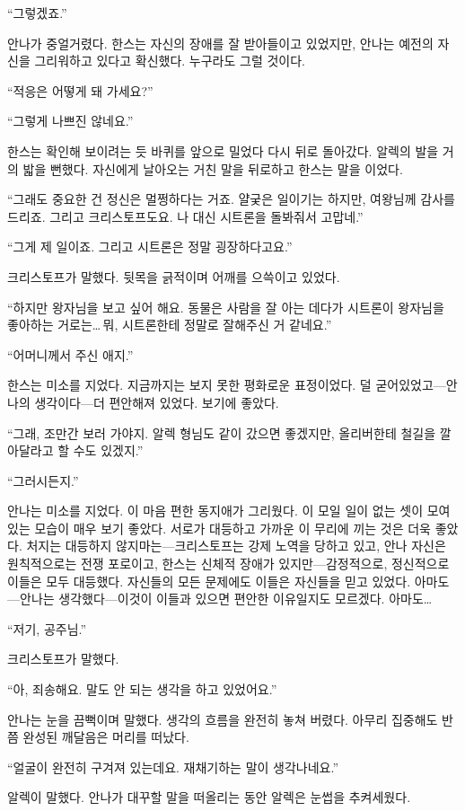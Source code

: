 ``그렇겠죠.''

안나가 중얼거렸다. 한스는 자신의 장애를 잘 받아들이고 있었지만, 안나는 예전의 자신을 그리워하고 있다고 확신했다. 누구라도 그럴 것이다.

``적응은 어떻게 돼 가세요?''

``그렇게 나쁘진 않네요.''

한스는 확인해 보이려는 듯 바퀴를 앞으로 밀었다 다시 뒤로 돌아갔다. 알렉의 발을 거의 밟을 뻔했다. 자신에게 날아오는 거친 말을 뒤로하고 한스는 말을 이었다.

``그래도 중요한 건 정신은 멀쩡하다는 거죠. 얄궂은 일이기는 하지만, 여왕님께 감사를 드리죠. 그리고 크리스토프도요. 나 대신 시트론을 돌봐줘서 고맙네.''

``그게 제 일이죠. 그리고 시트론은 정말 굉장하다고요.''

크리스토프가 말했다. 뒷목을 긁적이며 어깨를 으쓱이고 있었다.

``하지만 왕자님을 보고 싶어 해요. 동물은 사람을 잘 아는 데다가 시트론이 왕자님을 좋아하는 거로는\ldots\,뭐, 시트론한테 정말로 잘해주신 거 같네요.''

``어머니께서 주신 애지.''

한스는 미소를 지었다. 지금까지는 보지 못한 평화로운 표정이었다. 덜 굳어있었고—안나의 생각이다—더 편안해져 있었다. 보기에 좋았다.

``그래, 조만간 보러 가야지. 알렉 형님도 같이 갔으면 좋겠지만, 올리버한테 철길을 깔아달라고 할 수도 있겠지.''

``그러시든지.''

안나는 미소를 지었다. 이 마음 편한 동지애가 그리웠다. 이 모일 일이 없는 셋이 모여 있는 모습이 매우 보기 좋았다. 서로가 대등하고 가까운 이 무리에 끼는 것은 더욱 좋았다. 처지는 대등하지 않지마는—크리스토프는 강제 노역을 당하고 있고, 안나 자신은 원칙적으로는 전쟁 포로이고, 한스는 신체적 장애가 있지만—감정적으로, 정신적으로 이들은 모두 대등했다. 자신들의 모든 문제에도 이들은 자신들을 믿고 있었다. 아마도—안나는 생각했다—이것이 이들과 있으면 편안한 이유일지도 모르겠다. 아마도\ldots

``저기, 공주님.''

크리스토프가 말했다.

``아, 죄송해요. 말도 안 되는 생각을 하고 있었어요.''

안나는 눈을 끔뻑이며 말했다. 생각의 흐름을 완전히 놓쳐 버렸다. 아무리 집중해도 반쯤 완성된 깨달음은 머리를 떠났다.

``얼굴이 완전히 구겨져 있는데요. 재채기하는 말이 생각나네요.''

알렉이 말했다. 안나가 대꾸할 말을 떠올리는 동안 알렉은 눈썹을 추켜세웠다.

